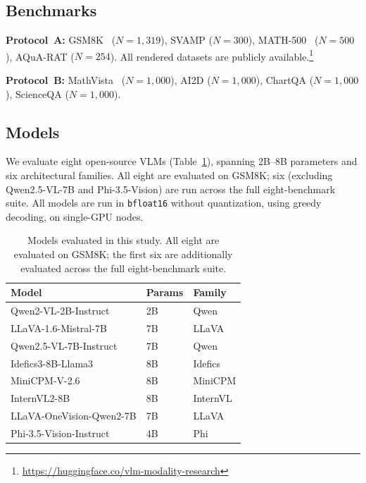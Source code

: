 \documentclass[11pt]{article}
\begin{document}
\subsection{Benchmarks}

\noindent\textbf{Protocol~A:} GSM8K~\cite{cobbe2021gsm8k} ($N{=}1{,}319$), SVAMP ($N{=}300$), MATH-500~\cite{hendrycks2021math} ($N{=}500$), AQuA-RAT ($N{=}254$). All rendered datasets are publicly available.\footnote{\url{https://huggingface.co/vlm-modality-research}}

\noindent\textbf{Protocol~B:} MathVista~\cite{lu2023mathvista} ($N{=}1{,}000$), AI2D ($N{=}1{,}000$), ChartQA ($N{=}1{,}000$), ScienceQA ($N{=}1{,}000$).

\subsection{Models}

We evaluate eight open-source VLMs (Table~\ref{tab:models}), spanning 2B--8B parameters and six architectural families. All eight are evaluated on GSM8K; six (excluding Qwen2.5-VL-7B and Phi-3.5-Vision) are run across the full eight-benchmark suite. All models are run in \texttt{bfloat16} without quantization, using greedy decoding, on single-GPU nodes.

\begin{table}[h]
\centering
\small
\begin{tabular}{lll}
\toprule
\textbf{Model} & \textbf{Params} & \textbf{Family} \\
\midrule
Qwen2-VL-2B-Instruct        & 2B  & Qwen    \\
LLaVA-1.6-Mistral-7B        & 7B  & LLaVA   \\
Qwen2.5-VL-7B-Instruct      & 7B  & Qwen    \\
Idefics3-8B-Llama3          & 8B  & Idefics \\
MiniCPM-V-2.6               & 8B  & MiniCPM \\
InternVL2-8B                & 8B  & InternVL\\
LLaVA-OneVision-Qwen2-7B    & 7B  & LLaVA   \\
Phi-3.5-Vision-Instruct     & 4B  & Phi     \\
\bottomrule
\end{tabular}
\caption{Models evaluated in this study. All eight are evaluated on GSM8K; the
first six are additionally evaluated across the full eight-benchmark suite.}
\label{tab:models}
\end{table}
\end{document}
